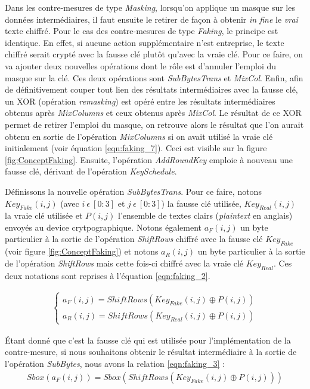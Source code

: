\documentclass[oneside]{book}
\begin{document}
Dans les contre-mesures de type \textit{Masking}, lorsqu'on applique un masque sur les données intermédiaires, il faut ensuite le retirer de façon à obtenir \textit{in fine} le \textit{vrai} texte chiffré. Pour le cas des contre-mesures de type \textit{Faking}, le principe est identique. En effet, si aucune action supplémentaire n'est entreprise, le texte chiffré serait crypté avec la fausse clé plutôt qu'avec la vraie clé. Pour ce faire, on va ajouter deux nouvelles opérations dont le rôle est d'annuler l'emploi du masque sur la clé. Ces deux opérations sont \textit{SubBytesTrans} et \textit{MixCol}. Enfin, afin de définitivement couper tout lien des résultats intermédiaires avec la fausse clé, un XOR (opération \textit{remasking}) est opéré entre les résultats intermédiaires obtenus après \textit{MixColumns} et ceux obtenus après \textit{MixCol}. Le résultat de ce XOR permet de retirer l'emploi du masque, on retrouve alors le résultat que l'on aurait obtenu en sortie de l'opération \textit{MixColumns} si on avait utilisé la vraie clé initialement (voir équation \ref{eqn:faking_7}). Ceci est visible sur la figure \ref{fig:ConceptFaking}. Ensuite, l'opération \textit{AddRoundKey} emploie à nouveau une fausse clé, dérivant de l'opération \textit{KeySchedule}.

Définissons la nouvelle opération \textit{SubBytesTrans}. Pour ce faire, notons $Key_{Fake}(i,j)$ (avec $i \ \epsilon \ [0:3]$ et $j \ \epsilon \ [0:3]$) la fausse clé utilisée, $Key_{Real}(i,j)$ la vraie clé utilisée et $P(i,j)$ l'ensemble de textes clairs (\textit{plaintext} en anglais) envoyés au device crytpographique. Notons également $a_{F}(i,j)$ un byte particulier à la sortie de l'opération \textit{ShiftRows} chiffré avec la fausse clé $Key_{Fake}$ (voir figure \ref{fig:ConceptFaking}) et notons $a_{R}(i,j)$ un byte particulier à la sortie de l'opération \textit{ShiftRows} mais cette fois-ci chiffré avec la vraie clé $Key_{Real}$. Ces deux notations sont reprises à l'équation \ref{eqn:faking_2}.

\begin{gather}
	\left\{\begin{matrix}
	a_{F}(i,j) = ShiftRows(Key_{Fake}(i,j) \oplus P(i,j)) \\ 
	a_{R}(i,j) = ShiftRows(Key_{Real}(i,j) \oplus P(i,j))
	\end{matrix}\right.\label{eqn:faking_2}
\end{gather}

\hspace{-0.5cm}Étant donné que c'est la fausse clé qui est utilisée pour l'implémentation de la contre-mesure, si nous souhaitons obtenir le résultat intermédiaire à la sortie de l'opération \textit{SubBytes}, nous avons la relation \ref{eqn:faking_3} :
\begin{gather}
	Sbox(a_{F}(i,j)) = Sbox(ShiftRows(Key_{Fake}(i,j) \oplus P(i,j)))\label{eqn:faking_3}
\end{gather}
\end{document}
